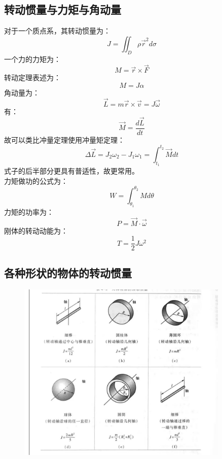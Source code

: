 \documentclass{ctexart}
\begin{document}
\subsection{转动惯量与力矩与角动量}
对于一个质点系，其转动惯量为：
$$
    J = \iint_{D} \rho \vec{r}^2 d \sigma
$$
一个力的力矩为：
$$
    M = \vec{r} \times \vec{F}
$$
转动定理表述为：
$$
    M = J \alpha
$$
角动量为：
$$
    \vec{L} = m \vec{r} \times \vec{v} = J \vec{\omega}
$$
有：
$$
    \vec{M} = \frac{d\vec{L}}{dt}
$$
故可以类比冲量定理使用冲量矩定理：
$$
    \Delta \vec{L} =J_2\omega_2 - J_1\omega_1 = \int_{t_1}^{t_2} \vec{M} dt
$$
式子的后半部分更具有普适性，故更常用。\\
力矩做功的公式为：
$$
    W = \int_{\theta_1}^{\theta_2} M d\theta
$$
力矩的功率为：
$$
    P = \vec{M} \cdot \vec{\omega}
$$
刚体的转动动能为：
$$
    T = \frac{1}{2} J \omega^2
$$
\subsection{各种形状的物体的转动惯量}
\begin{figure}[H]
    \centering
    \includegraphics[width=0.9\textwidth]{img/4-2.jpg}
\end{figure}
\end{document}
